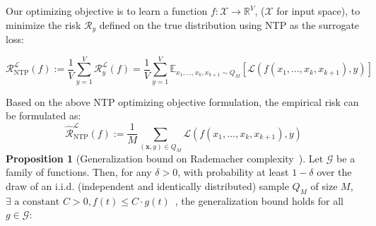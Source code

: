 Our optimizing objective 
is to learn a function $f: \mathcal{X}\rightarrow\mathbb{R}^{V}$, ($\mathcal{X}$ for input space), to minimize the risk $\mathcal{R}_{y}$ defined on the true distribution using NTP as the surrogate loss:
\begin{small}
\begin{equation}
\mathcal{R}^{\mathcal{L}}_\mathrm{NTP}(f) := \frac{1}{V} \sum_{y=1}^{V} \mathcal{R}^{\mathcal{L}}_y(f) = \frac{1}{V} \sum_{y=1}^{V} \mathbb{E}_{{x}_1, \dots, {x}_k, {x}_{k+1} \sim Q_M} [\mathcal{L}(f({x}_1, \dots, {x}_k, {x}_{k+1}), y)]
\end{equation}
\end{small}
Based on the above NTP optimizing objective formulation, the empirical risk can be formulated as:
\begin{equation}
\widehat{\mathcal{R}}^{\mathcal{L}}_\mathrm{NTP}(f) := \frac{1}{M} \sum_{(\boldsymbol{x},y) \in Q_{M}} \mathcal{L}(f(x_1, ..., x_k, x_{k+1}), y)
\end{equation}
\textbf{Proposition 1} (Generalization bound on Rademacher complexity~\cite{mohri2018foundations}).
Let $\mathcal{G}$ be a family of functions. Then, for any $\delta > 0 $, with probability at least $1 - \delta$ over the draw of an i.i.d. (independent and identically distributed) sample $Q_M$ of size $M$, $ \exists \text{ a constant } C > 0, f(t) \le C \cdot g(t)$~\cite{wang2024unified}, the generalization bound holds for all $g \in \mathcal{G}$:
